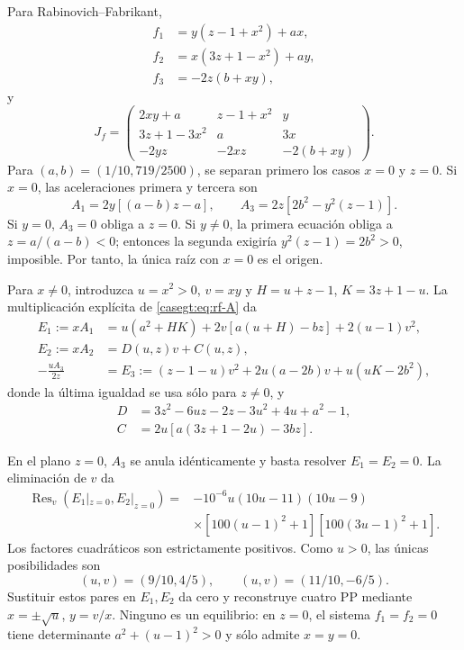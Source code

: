 Para Rabinovich--Fabrikant,
\begin{align}
 f_1&=y(z-1+x^2)+ax,\\
 f_2&=x(3z+1-x^2)+ay,\\
 f_3&=-2z(b+xy),
\end{align}
y
\begin{equation}
 J_f=\begin{pmatrix}
 2xy+a&z-1+x^2&y\\
 3z+1-3x^2&a&3x\\
 -2yz&-2xz&-2(b+xy)
 \end{pmatrix}.
 \label{eq:pp-rf-jacobian}
\end{equation}
Para \((a,b)=(1/10,719/2500)\), se separan primero los casos \(x=0\)
y \(z=0\). Si \(x=0\), las aceleraciones primera y tercera son
\[
 A_1=2y[(a-b)z-a],\qquad
 A_3=2z[2b^2-y^2(z-1)].
\]
Si \(y=0\), \(A_3=0\) obliga a \(z=0\). Si \(y\ne0\), la primera
ecuación obliga a \(z=a/(a-b)<0\); entonces la segunda exigiría
\(y^2(z-1)=2b^2>0\), imposible. Por tanto, la única raíz con \(x=0\)
es el origen.

Para \(x\ne0\), introduzca \(u=x^2>0\), \(v=xy\) y
\(H=u+z-1\), \(K=3z+1-u\). La multiplicación explícita de
\cref{casegt:eq:rf-A} da
\begin{align}
 E_1:=xA_1&=u(a^2+HK)+2v[a(u+H)-bz]+2(u-1)v^2,\nonumber\\
 E_2:=xA_2&=D(u,z)v+C(u,z),\label{eq:pp-rf-reduced-three}\\
 -\frac{uA_3}{2z}&=E_3:=(z-1-u)v^2+2u(a-2b)v+u(uK-2b^2),\nonumber
\end{align}
donde la última igualdad se usa sólo para \(z\ne0\), y
\begin{align}
 D&=3z^2-6uz-2z-3u^2+4u+a^2-1,\nonumber\\
 C&=2u[a(3z+1-2u)-3bz].
 \label{eq:pp-rf-D-C}
\end{align}

En el plano \(z=0\), \(A_3\) se anula idénticamente y basta resolver
\(E_1=E_2=0\). La eliminación de \(v\) da
\begin{align}
 \operatorname{Res}_v(E_1|_{z=0},E_2|_{z=0})
 ={}&-10^{-6}u(10u-11)(10u-9)\nonumber\\
 &\times[100(u-1)^2+1][100(3u-1)^2+1].
 \label{eq:pp-rf-z0-resultant}
\end{align}
Los factores cuadráticos son estrictamente positivos. Como \(u>0\), las
únicas posibilidades son
\[
 (u,v)=(9/10,4/5),\qquad (u,v)=(11/10,-6/5).
\]
Sustituir estos pares en \(E_1,E_2\) da cero y reconstruye cuatro PP
mediante \(x=\pm\sqrt u\), \(y=v/x\). Ninguno es un equilibrio:
en \(z=0\), el sistema \(f_1=f_2=0\) tiene determinante
\(a^2+(u-1)^2>0\) y sólo admite \(x=y=0\).

